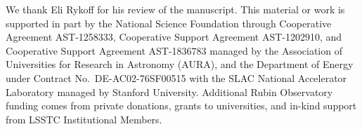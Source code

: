 \documentclass[]{spie}
\begin{document}
\acknowledgments

We thank Eli Rykoff for his review of the manuscript.
This material or work is supported in part by the National Science Foundation through Cooperative Agreement AST-1258333, Cooperative Support Agreement AST-1202910, and Cooperative Support Agreement AST-1836783 managed by the Association of Universities for Research in Astronomy (AURA), and the Department of Energy under Contract No.\ DE-AC02-76SF00515 with the SLAC National Accelerator Laboratory managed by Stanford University.
Additional Rubin Observatory funding comes from private donations, grants to universities, and in-kind support from LSSTC Institutional Members.



\end{document}
